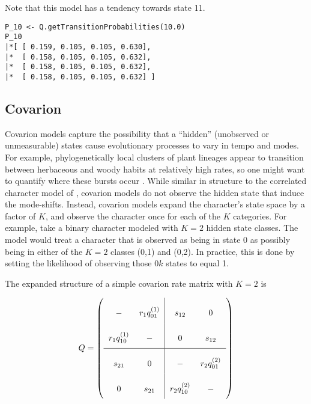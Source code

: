 Note that this model has a tendency towards state 11.

{\tt \begin{snugshade*}
\begin{lstlisting}
P_10 <- Q.getTransitionProbabilities(10.0)
P_10
|*[ [ 0.159, 0.105, 0.105, 0.630],
|*  [ 0.158, 0.105, 0.105, 0.632],
|*  [ 0.158, 0.105, 0.105, 0.632],
|*  [ 0.158, 0.105, 0.105, 0.632] ]
\end{lstlisting}
\end{snugshade*}}


\subsection{Covarion}

Covarion models \citep{Tuffley1998} capture the possibility that a ``hidden'' (unobserved or unmeasurable) states cause evolutionary processes to vary in tempo and modes.
For example, phylogenetically local clusters of plant lineages appear to transition between herbaceous and woody habits at relatively high rates, so one might want to quantify where these bursts occur \citep{Beaulieu2013}.
While similar in structure to the correlated character model of \citet{Pagel1994}, covarion models do not observe the hidden state that induce the mode-shifts.
Instead, covarion models expand the character's state space by a factor of $K$, and observe the character once for each of the $K$ categories.
For example, take a binary character modeled with $K=2$ hidden state classes.
The model would treat a character that is observed as being in state 0 as possibly being in either of the $K=2$ classes (0,1) and (0,2).
In practice, this is done by setting the likelihood of observing those $0k$ states to equal 1.

The expanded structure of a simple covarion rate matrix with $K=2$ is

\begin{equation*}
Q = \left(
\arraycolsep=6pt\def\arraystretch{2.5}
\begin{array}{cc|cc}
- & r_1 q_{01}^{(1)} & s_{12} & 0 \\
r_1 q_{10}^{(1)} & - & 0 & s_{12} \\
\hline
s_{21} & 0 & - & r_2 q_{01}^{(2)} \\
0 & s_{21} & r_2 q_{10}^{(2)} & -  \\

\end{array}
\right)    
\end{equation*}

